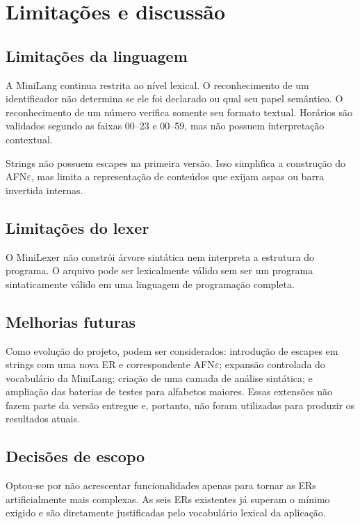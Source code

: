 \chapter{Limitações e discussão}

\section{Limitações da linguagem}

A MiniLang continua restrita ao nível lexical. O reconhecimento de um identificador não determina se ele foi declarado ou qual seu papel semântico. O reconhecimento de um número verifica somente seu formato textual. Horários são validados segundo as faixas 00--23 e 00--59, mas não possuem interpretação contextual.

Strings não possuem escapes na primeira versão. Isso simplifica a construção do AFN$\varepsilon$, mas limita a representação de conteúdos que exijam aspas ou barra invertida internas.

\section{Limitações do lexer}

O MiniLexer não constrói árvore sintática nem interpreta a estrutura do programa. O arquivo pode ser lexicalmente válido sem ser um programa sintaticamente válido em uma linguagem de programação completa.

\section{Melhorias futuras}

Como evolução do projeto, podem ser considerados: introdução de escapes em strings com uma nova ER e correspondente AFN$\varepsilon$; expansão controlada do vocabulário da MiniLang; criação de uma camada de análise sintática; e ampliação das baterias de testes para alfabetos maiores. Essas extensões não fazem parte da versão entregue e, portanto, não foram utilizadas para produzir os resultados atuais.

\section{Decisões de escopo}

Optou-se por não acrescentar funcionalidades apenas para tornar as ERs artificialmente mais complexas. As seis ERs existentes já superam o mínimo exigido e são diretamente justificadas pelo vocabulário lexical da aplicação.
